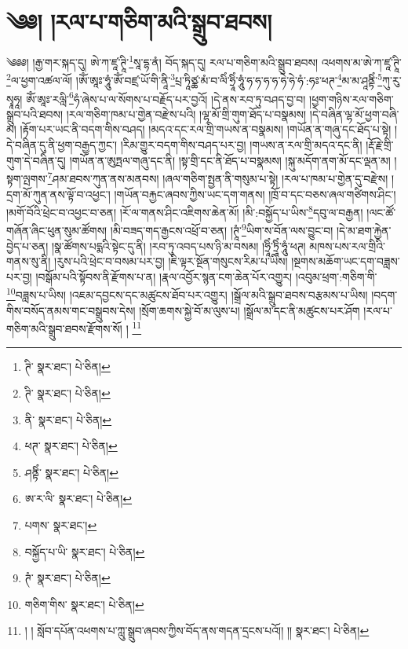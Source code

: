 \setcounter{footnote}{0} 
\chapter{༄༅། །རལ་པ་གཅིག་མའི་སྒྲུབ་ཐབས།}༄༅༅། །རྒྱ་གར་སྐད་དུ། ཨེ་ཀ་ཛཱ་ཊཱི་\footnote{ཊི་  སྣར་ཐང་།  པེ་ཅིན། }སཱ་དྷ་ནཾ། བོད་སྐད་དུ། རལ་པ་གཅིག་མའི་སྒྲུབ་ཐབས། འཕགས་མ་ཨེ་ཀ་ཛཱ་ཊཱི་\footnote{ཊི་  སྣར་ཐང་།  པེ་ཅིན། }ལ་ཕྱག་འཚལ་ལོ། །ཨོཾ་ཨཱཿ་ཧཱུཾ་ཨོཾ་བཛྲ་ཡོ་གི་ནཱི་\footnote{ནི་  སྣར་ཐང་།  པེ་ཅིན། }པྲ་ཏཱིཙྪ་མཾ་བ་ལིཾ་ཧྲཱིཾ་ཧཱུཾ་ཧ་ཧ་ཧ་ཧ་ཧེ་ཧེ་ཧཾ་:ཧཿ་ཕཊ་\footnote{ཕཊ་  སྣར་ཐང་།  པེ་ཅིན། }མ་མ་ཤཱནྟིཾ་\footnote{ཤནྟིཾ་  སྣར་ཐང་།  པེ་ཅིན། }ཀུ་རུ་སྭཱཧཱ། ཨོཾ་ཨཱཿ་རལླི་\footnote{ཨ་ར་ལི་  སྣར་ཐང་།  པེ་ཅིན། }ཧཾ་ཞེས་པ་ལ་སོགས་པ་བརྗོད་པར་བྱའོ། །དེ་ནས་རབ་ཏུ་བཤད་བྱ་བ། །ཕྱག་གཉིས་རལ་གཅིག་སྒྲུབ་པའི་ཐབས། །རལ་གཅིག་ཁམ་པ་གྱེན་བརྫེས་པའི། །ལྷ་མོ་གྲི་གུག་ཐོད་པ་བསྣམས། །དེ་བཞིན་ལྷ་མོ་ཕྱག་བཞི་མ། །རྟོག་པར་ཡང་ནི་བདག་གིས་བཤད། །མདའ་དང་རལ་གྲི་གཡས་ན་བསྣམས། །གཡོན་ན་གཞུ་དང་ཐོད་པ་སྟེ། །དེ་བཞིན་དུ་ནི་ཕྱག་བརྒྱད་ཀྱང་། །རིམ་གྱུར་བདག་གིས་བཤད་པར་བྱ། །གཡས་ན་རལ་གྲི་མདའ་དང་ནི། །རྡོ་རྗེ་གྲི་གུག་དེ་བཞིན་དུ། །གཡོན་ན་ཨུཏྤལ་གཞུ་དང་ནི། །སྟ་གྲི་དང་ནི་ཐོད་པ་བསྣམས། །སྐུ་མདོག་ནག་མོ་དང་ལྡན་མ། །སྟག་ལྤགས་\footnote{པགས་  སྣར་ཐང་། }ཤམ་ཐབས་ཀུན་ནས་མནབས། །ཞལ་གཅིག་སྤྱན་ནི་གསུམ་པ་སྟེ། །རལ་པ་ཁམ་པ་གྱེན་དུ་བརྫེས། །དྲག་མོ་ཀུན་ནས་ལྟོ་བ་འཕྱང་། །གཡོན་བརྐྱང་ཞབས་ཀྱིས་ཡང་དག་གནས། །ཁྲོ་བ་དང་བཅས་ཞལ་གཙིགས་ཤིང་། །མགོ་བོའི་ཕྲེང་བ་འཕྱང་བ་ཅན། །རོ་ལ་གནས་ཤིང་འཇིགས་ཆེན་མོ། །མི་:བསྐྱོད་པ་ཡིས་\footnote{བསྐྱོད་པ་ཡི་  སྣར་ཐང་།  པེ་ཅིན། }དབུ་ལ་བརྒྱན། །ལང་ཚོ་གཞོན་ཞིང་ཕུན་སུམ་ཚོགས། །མི་བཟད་གད་རྒྱངས་འཕྲོ་བ་ཅན། །ཊཱཾ་\footnote{ཊཾ་  སྣར་ཐང་།  པེ་ཅིན། }ཡིག་ས་བོན་ལས་བྱུང་བ། །དེ་མ་ཐག་རྐྱེན་བྱེད་པ་ཅན། །སྣ་ཚོགས་པདྨའི་སྟེང་དུ་ནི། །རབ་ཏུ་འབད་པས་ཉི་མ་བསམ། །ཧྲཱིཾ་ཏྲཱིཾ་ཧཱུཾ་ཕཊ། མཁས་པས་རལ་གྲིའི་གནས་སུ་ནི། །རུས་པའི་ཕྲེང་བ་བསམ་པར་བྱ། །ཇི་ལྟར་སྔོན་གསུངས་རིམ་པ་ཡིས། །སྔགས་མཆོག་ཡང་དག་བཟླས་པར་བྱ། །བསྒོམ་པའི་སྟོབས་ནི་རྫོགས་པ་ན། །རྣལ་འབྱོར་སྙན་ངག་ཆེན་པོར་འགྱུར། །འབུམ་ཕྲག་:གཅིག་གི་\footnote{གཅིག་གིས་  སྣར་ཐང་།  པེ་ཅིན། }བཟླས་པ་ཡིས། །འཇམ་དབྱངས་དང་མཚུངས་ཐོབ་པར་འགྱུར། །སྒྲོལ་མའི་སྒྲུབ་ཐབས་བརྩམས་པ་ཡིས། །བདག་གིས་བསོད་ནམས་གང་བསྒྲུབས་དེས། །སྲོག་ཆགས་སྐྱེ་བོ་མ་ལུས་པ། །སྒྲོལ་མ་དང་ནི་མཚུངས་པར་ཤོག །རལ་པ་གཅིག་མའི་སྒྲུབ་ཐབས་རྫོགས་སོ། ། \footnote{། ། སློབ་དཔོན་འཕགས་པ་ཀླུ་སྒྲུབ་ཞབས་ཀྱིས་བོད་ནས་གདན་དྲངས་པའོ།། །།  སྣར་ཐང་།  པེ་ཅིན། }